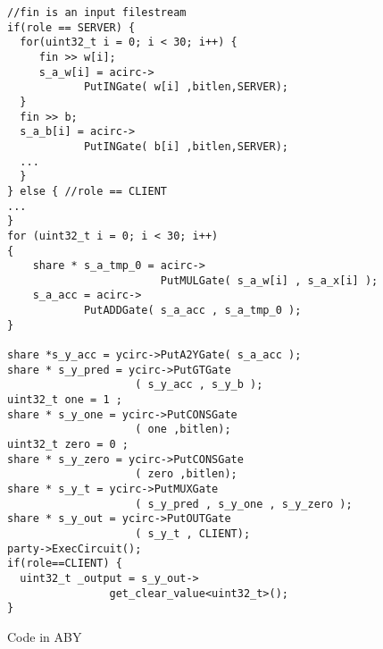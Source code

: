 \begin{figure}
\begin{verbatim}
//fin is an input filestream
if(role == SERVER) {
  for(uint32_t i = 0; i < 30; i++) {
     fin >> w[i];
     s_a_w[i] = acirc->
    		PutINGate( w[i] ,bitlen,SERVER);
  }
  fin >> b;
  s_a_b[i] = acirc->
    		PutINGate( b[i] ,bitlen,SERVER); 
  ...
  }
} else { //role == CLIENT
...
}
for (uint32_t i = 0; i < 30; i++)
{
    share * s_a_tmp_0 = acirc->
    					PutMULGate( s_a_w[i] , s_a_x[i] );
    s_a_acc = acirc->
    		PutADDGate( s_a_acc , s_a_tmp_0 );
}

share *s_y_acc = ycirc->PutA2YGate( s_a_acc );
share * s_y_pred = ycirc->PutGTGate
					( s_y_acc , s_y_b );
uint32_t one = 1 ;
share * s_y_one = ycirc->PutCONSGate
					( one ,bitlen);
uint32_t zero = 0 ;
share * s_y_zero = ycirc->PutCONSGate
					( zero ,bitlen);
share * s_y_t = ycirc->PutMUXGate
					( s_y_pred , s_y_one , s_y_zero );
share * s_y_out = ycirc->PutOUTGate
					( s_y_t , CLIENT);
party->ExecCircuit();
if(role==CLIENT) {
  uint32_t _output = s_y_out->
			    get_clear_value<uint32_t>();
}
\end{verbatim}
\caption{Code in ABY}
\label{fig:ex-aby}
\end{figure}